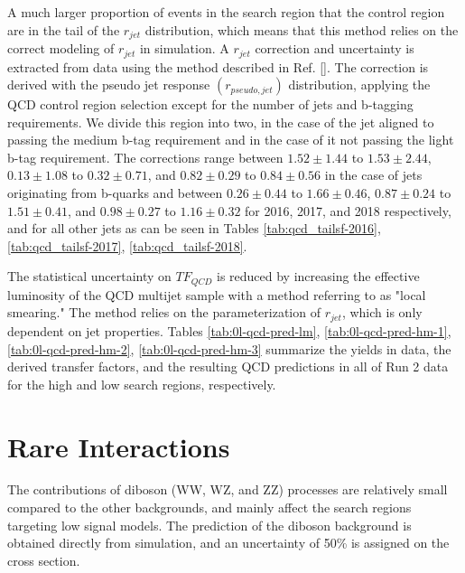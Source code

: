 A much larger proportion of events in the search region that the control region are in the tail of the $r_{jet}$ distribution, which means that this method relies on the correct modeling of $r_{jet}$ in simulation. A $r_{jet}$ correction and uncertainty is extracted from data using the method described in Ref. []. The correction is derived with the pseudo jet response $(r_{pseudo,jet})$ distribution, applying the QCD control region selection except for the number of jets and b-tagging requirements. We divide this region into two, in the case of the jet aligned to \met{} passing the medium b-tag requirement and in the case of it not passing the light b-tag requirement. The corrections range between $1.52\pm1.44$ to $1.53\pm2.44$, $0.13\pm1.08$ to $0.32\pm0.71$, and $0.82\pm0.29$ to $0.84\pm0.56$ in the case of jets originating from b-quarks and between $0.26\pm0.44$ to $1.66\pm0.46$, $0.87\pm0.24$ to $1.51\pm0.41$, and $0.98\pm0.27$ to $1.16\pm0.32$ for 2016, 2017, and 2018 respectively, and for all other jets as can be seen in Tables \ref{tab:qcd_tailsf-2016}, \ref{tab:qcd_tailsf-2017}, \ref{tab:qcd_tailsf-2018}.



The statistical uncertainty on $TF_{QCD}$ is reduced by increasing the effective luminosity of the QCD multijet sample with a method referring to as "local smearing." The method relies on the parameterization of $r_{jet}$, which is only dependent on jet properties. Tables \ref{tab:0l-qcd-pred-lm}, \ref{tab:0l-qcd-pred-hm-1}, \ref{tab:0l-qcd-pred-hm-2}, \ref{tab:0l-qcd-pred-hm-3} summarize the yields in data, the derived transfer factors, and the resulting QCD predictions in all \datalumi{} of Run 2 data for the high \dm{} and low \dm{} search regions, respectively. 






\section{Rare Interactions}
\label{subsec:rare}

The contributions of diboson (WW, WZ, and ZZ) processes are relatively small compared to the other backgrounds, and mainly affect the search regions targeting low \dm{} signal models. The prediction of the diboson background is obtained directly from simulation, and an uncertainty of 50\% is assigned on the cross section.

